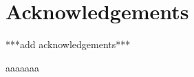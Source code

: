 \chapter{Acknowledgements}
\label{chpr:acknowledgement}

***add acknowledgements***

\bigskip
\noindent

\bigskip 
\noindent
aaaaaaa
